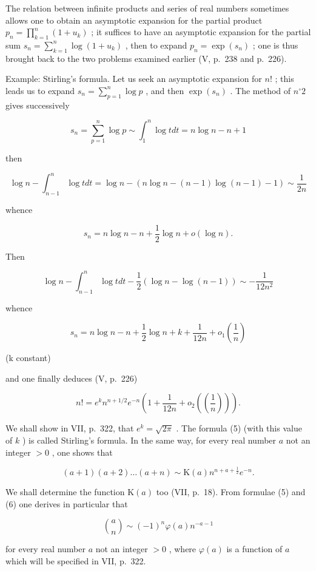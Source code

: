 The relation between infinite products and series of real numbers sometimes allows one to obtain an asymptotic expansion for the partial product \(p_{n} = \prod_{k=1}^{n}(1 + u_{k})\) ; it suffices to have an asymptotic expansion for the partial sum \(s_{n} = \sum_{k=1}^{n} \log(1 + u_{k})\) , then to expand \(p_{n} = \exp(s_{n})\) ; one is thus brought back to the two problems examined earlier (V, p.~238 and p.~226).

Example: Stirling's formula. Let us seek an asymptotic expansion for \(n!\) ; this leads us to expand \(s_n = \sum_{p=1}^{n} \log p\) , and then \(\exp(s_n)\) . The method of \(n^{\circ} 2\) gives successively

\[
s _ {n} = \sum_ {p = 1} ^ {n} \log p \sim \int_ {1} ^ {n} \log t d t = n \log n - n + 1
\]

then

\[
\log n - \int_ {n - 1} ^ {n} \log t d t = \log n - (n \log n - (n - 1) \log (n - 1) - 1) \sim \frac {1}{2 n}
\]

whence

\[
s _ {n} = n \log n - n + \frac {1}{2} \log n + o (\log n).
\]

Then

\[
\log n - \int_ {n - 1} ^ {n} \log t d t - \frac {1}{2} (\log n - \log (n - 1)) \sim - \frac {1}{1 2 n ^ {2}}
\]

whence

\[
s _ {n} = n \log n - n + \frac {1}{2} \log n + k + \frac {1}{1 2 n} + o _ {1} \left(\frac {1}{n}\right)
\]

(k constant)

and one finally deduces (V, p.~226)

\[
n! = e ^ {k} n ^ {n + 1 / 2} e ^ {- n} \left(1 + \frac {1}{1 2 n} + o _ {2} \left(\left(\frac {1}{n}\right)\right)\right).\tag{5}
\]

We shall show in VII, p.~322, that \(e^k = \sqrt{2\pi}\) . The formula (5) (with this value of \(k\) ) is called Stirling's formula. In the same way, for every real number \(a\) not an integer \(>0\) , one shows that

\[
(a + 1) (a + 2) \dots (a + n) \sim \mathrm{K} (a) n ^ {n + a + \frac {1}{2}} e ^ {- n}.\tag{6}
\]

We shall determine the function \(\mathrm{K}(a)\) too (VII, p.~18). From formulae (5) and (6) one derives in particular that

\[
\binom {a} {n} \sim (- 1) ^ {n}   \varphi (a)   n ^ {- a - 1}\tag{7}
\]

for every real number \(a\) not an integer \(> 0\) , where \(\varphi(a)\) is a function of \(a\) which will be specified in VII, p.~322.

